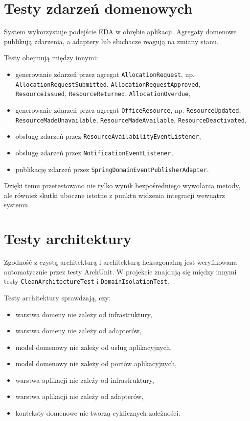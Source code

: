 \section{Testy zdarzeń domenowych}

System wykorzystuje podejście EDA w obrębie aplikacji. Agregaty domenowe publikują zdarzenia, a adaptery lub słuchacze reagują na zmiany stanu.

Testy obejmują między innymi:
\begin{itemize}
    \item generowanie zdarzeń przez agregat \texttt{AllocationRequest}, np. \texttt{AllocationRequestSubmitted}, \texttt{AllocationRequestApproved}, \texttt{ResourceIssued}, \texttt{ResourceReturned}, \texttt{AllocationOverdue},
    \item generowanie zdarzeń przez agregat \texttt{OfficeResource}, np. \texttt{ResourceUpdated}, \texttt{ResourceMadeUnavailable}, \texttt{ResourceMadeAvailable}, \texttt{ResourceDeactivated},
    \item obsługę zdarzeń przez \texttt{ResourceAvailabilityEventListener},
    \item obsługę zdarzeń przez \texttt{NotificationEventListener},
    \item publikację zdarzeń przez \texttt{SpringDomainEventPublisherAdapter}.
\end{itemize}

Dzięki temu przetestowano nie tylko wynik bezpośredniego wywołania metody, ale również skutki uboczne istotne z punktu widzenia integracji wewnątrz systemu.

\section{Testy architektury}

Zgodność z czystą architekturą i architekturą heksagonalną jest weryfikowana automatycznie przez testy ArchUnit. W projekcie znajdują się między innymi testy \texttt{CleanArchitectureTest} i \texttt{DomainIsolationTest}.

Testy architektury sprawdzają, czy:
\begin{itemize}
    \item warstwa domeny nie zależy od infrastruktury,
    \item warstwa domeny nie zależy od adapterów,
    \item model domenowy nie zależy od usług aplikacyjnych,
    \item model domenowy nie zależy od portów aplikacyjnych,
    \item warstwa aplikacji nie zależy od infrastruktury,
    \item warstwa aplikacji nie zależy od adapterów,
    \item konteksty domenowe nie tworzą cyklicznych zależności.
\end{itemize}

